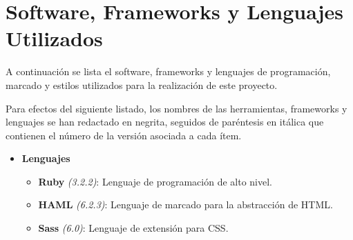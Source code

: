 \section{Software, Frameworks y  Lenguajes Utilizados}
\label{project:software}
A continuación se lista el software, frameworks y lenguajes de programación, marcado y estilos utilizados para la realización de este proyecto.

Para efectos del siguiente listado, los nombres de las herramientas, frameworks y lenguajes se han redactado en negrita, seguidos de paréntesis en itálica que contienen el número de la versión asociada a cada ítem.

\begin{itemize}
	\item[] \textbf{Lenguajes}
	\begin{itemize}
		\item \textbf{Ruby} \textit{(3.2.2)}: Lenguaje de programación de alto nivel.
		\item \textbf{HAML} \textit{(6.2.3)}: Lenguaje de marcado para la abstracción de HTML.
		\item \textbf{Sass} \textit{(6.0)}: Lenguaje de extensión para CSS.
	\end{itemize}
\end{itemize}

